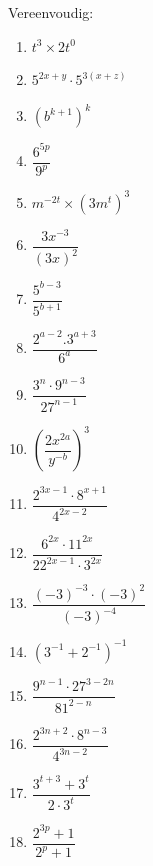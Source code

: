 \begin{eocexercises}{}


Vereenvoudig:
\begin{multicols}{2}
\begin{enumerate}[noitemsep, label=\textbf{\arabic*}., itemsep=5pt]
\item $ t^3 \times 2t^0 $
\item $ 5^{2x+y} \cdot 5^{3(x+z)} $
\item $ (b^{k+1})^k $
\item $ \dfrac{6^{5p}}{9^p} $
\item $ m^{-2t} \times (3m^t)^3 $
\item $\dfrac{3{x}^{-3}}{{\left(3x\right)}^{2}}$
\item $\dfrac{{5}^{b-3}}{{5}^{b+1}}$
\item $\dfrac{{2}^{a-2}.{3}^{a+3}}{{6}^{a}}$
\item $\dfrac{{3}^{n}\ensuremath{\cdot}{9}^{n-3}}{{27}^{n-1}}$
\item ${\left(\dfrac{2{x}^{2a}}{{y}^{-b}}\right)}^{3}$
\item $\dfrac{{2}^{3x-1}\ensuremath{\cdot}{8}^{x+1}}{{4}^{2x-2}}$
\item $\dfrac{{6}^{2x}\ensuremath{\cdot}{11}^{2x}}{{22}^{2x-1}\ensuremath{\cdot}{3}^{2x}}$
\item $\dfrac{{\left(-3\right)}^{-3}\ensuremath{\cdot}{\left(-3\right)}^{2}}{{\left(-3\right)}^{-4}}$
\item ${\left({3}^{-1}+{2}^{-1}\right)}^{-1}$
\item $\dfrac{{9}^{n-1}\ensuremath{\cdot}{27}^{3-2n}}{{81}^{2-n}}$
\item $\dfrac{{2}^{3n+2}\ensuremath{\cdot}{8}^{n-3}}{{4}^{3n-2}}$
\item $\dfrac{3^{t+3} + 3^t}{2 \cdot 3^t} $
\item $\dfrac{2^{3p} +1}{2^p + 1} $
\end{enumerate}
\end{multicols}




\end{eocexercises}
